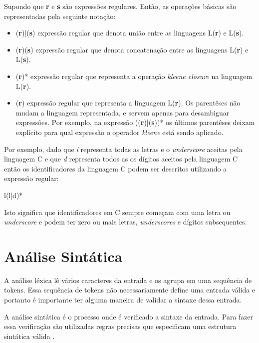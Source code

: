 Supondo que \textbf{r} e \textbf{s} são expressões regulares. Então, as operações básicas 
são representadas pela seguinte notação:

\begin{itemize}
    \item (\textbf{r})|(\textbf{s}) expressão regular que denota união entre as linguagens L(\textbf{r}) e 
    L(\textbf{s}).
    \item (\textbf{r})(\textbf{s}) expressão regular que denota concatenação entre as linguagens L(\textbf{r}) e 
    L(\textbf{s}).
    \item (\textbf{r})* expressão regular que representa a operação \textit{kleene closure} na linguagem L(\textbf{r}).
    \item (\textbf{r}) expressão regular que representa a linguagem L(\textbf{r}). Os parentêses não mudam
    a linguagem representada, e servem apenas para desambiguar expressões. Por exemplo, 
    na expressão ((\textbf{r})|(\textbf{s}))* os últimos parentêses deixam explícito para qual expressão 
    o operador \textit{kleene} está sendo aplicado.
\end{itemize}

Por exemplo, dado que \textit{l} representa todas as letras e o \textit{underscore} 
aceitas pela linguagem C e que \textit{d} representa todos as os dígitos aceitos 
pela linguagem C então os identificadores da linguagem C podem ser descritos utilizando 
a expressão regular:

\begin{center}
l(l|d)*
\end{center}
Isto significa que identificadores em C sempre começam com uma letra ou \textit{underscore} 
e podem ter zero ou mais letras, \textit{underscores} e dígitos subsequentes.

\section{Análise Sintática}
\label{sec:sintatic}

A análise léxica lê vários caracteres da entrada e os agrupa em uma sequência de tokens. Essa sequência de
tokens não necessariamente define uma entrada válida e portanto é importante ter alguma maneira de
validar a sintaxe dessa entrada.

A análise sintática é o processo onde é verificado a sintaxe da entrada. 
Para fazer essa verificação são utilizadas regras precisas que especificam 
uma estrutura sintática válida \cite{aho2006}.

